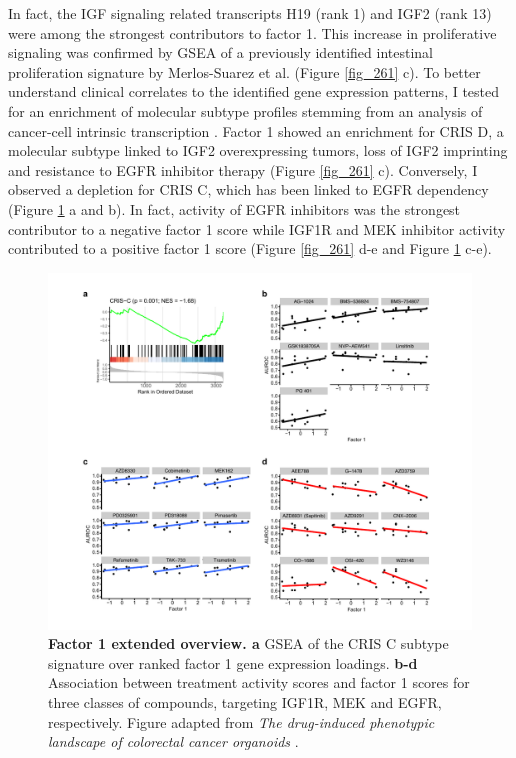 \begin{flushleft}
In fact, the IGF signaling related transcripts H19 (rank 1) and IGF2 (rank 13) were among the strongest contributors to factor 1. This increase in proliferative signaling was confirmed by GSEA of a previously identified intestinal proliferation signature by Merlos-Suarez et al. \citep{merlos-suarezIntestinalStemCell2011} (Figure \ref{fig_261} c). To better understand clinical correlates to the identified gene expression patterns, I tested for an enrichment of molecular subtype profiles stemming from an analysis of cancer-cell intrinsic transcription \citep{isellaSelectiveAnalysisCancercell2017}. Factor 1 showed an enrichment for CRIS D, a molecular subtype linked to IGF2 overexpressing tumors, loss of IGF2 imprinting and resistance to EGFR inhibitor therapy (Figure \ref{fig_261} c). Conversely, I observed a depletion for CRIS C, which has been linked to EGFR dependency (Figure \ref{fig_262} a and b). In fact, activity of EGFR inhibitors was the strongest contributor to a negative factor 1 score while IGF1R and MEK inhibitor activity contributed to a positive factor 1 score (Figure \ref{fig_261} d-e and Figure \ref{fig_262} c-e).

\begin{figure}[h!]
\centering
\includegraphics[width=\textwidth,
                height=\textheight,
                keepaspectratio]{figures/promise/pdf/fig_6_2_1.pdf}
\caption[Factor 1 extended overview]{\textbf{Factor 1 extended overview. a} GSEA of the CRIS C subtype signature over ranked factor 1 gene expression loadings. \textbf{b-d} Association between treatment activity scores and factor 1 scores for three classes of compounds, targeting IGF1R, MEK and EGFR, respectively. Figure adapted from \textit{The drug-induced phenotypic landscape of colorectal cancer organoids} \citep{betgeDruginducedPhenotypicLandscape2022}.}
\label{fig_262}
\end{figure}
\bigbreak


\end{flushleft}
